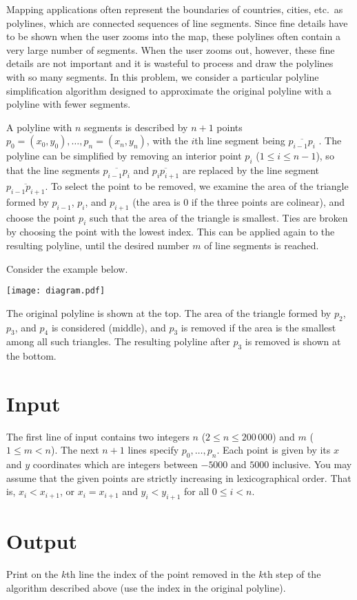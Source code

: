 
Mapping applications often represent the boundaries of countries,
cities, etc.\ as polylines, which are connected sequences of line
segments.  Since fine details have to be shown when the user zooms
into the map, these polylines often contain a very large number of
segments.  When the user zooms out, however, these fine details are
not important and it is wasteful to process and draw the polylines
with so many segments.  In this problem, we consider a particular
polyline simplification algorithm designed to approximate the original
polyline with a polyline with fewer segments.

A polyline with $n$ segments is described by $n+1$ points $p_0 = (x_0,
y_0), \ldots, p_n = (x_n, y_n)$, with the $i$th line segment being
$\overline{p_{i-1}p_i}$ .  The polyline can be simplified by removing
an interior point $p_i$ ($1 \leq i \leq n-1$), so that the line
segments $\overline{p_{i-1}p_i}$ and $\overline{p_ip_{i+1}}$ are
replaced by the line segment $\overline{p_{i-1}p_{i+1}}$.  To select
the point to be removed, we examine the area of the triangle formed by
$p_{i-1}$, $p_i$, and $p_{i+1}$ (the area is $0$ if the three points are
colinear), and choose the point $p_i$ such that the area of the
triangle is smallest.  Ties are broken by choosing the point with the
lowest index.  This can be applied again to the resulting polyline,
until the desired number $m$ of line segments is reached.

Consider the example below.
\begin{center}
\texttt{[image: diagram.pdf]}
\end{center}
The original polyline is shown at the top.  The area of the triangle
formed by $p_2$, $p_3$, and $p_4$ is considered (middle), and $p_3$ is
removed if the area is the smallest among all such triangles.  The
resulting polyline after $p_3$ is removed is shown at the bottom.

\section*{Input}

The first line of input contains two integers $n$ ($2 \leq n \leq
200\,000$) and $m$ ($1 \leq m < n$).  The next $n+1$ lines specify
$p_0, \ldots, p_n$.  Each point is given by its $x$ and $y$
coordinates which are integers between $-5000$ and $5000$ inclusive.
You may assume that the given points are strictly increasing in
lexicographical order.  That is, $x_i < x_{i+1}$, or $x_i = x_{i+1}$
and $y_i < y_{i+1}$ for all $0 \leq i < n$.


\section*{Output}

Print on the $k$th line the index of the point removed in the $k$th
step of the algorithm described above (use the index in the original
polyline).
